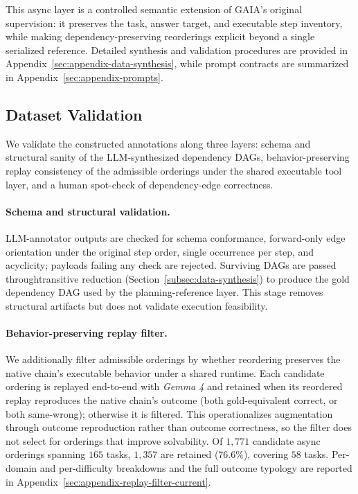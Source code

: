 \documentclass{article}
\providecommand{\model}[1]{\emph{#1}}
\begin{document}
This async layer is a controlled semantic extension of GAIA's original supervision: it preserves the task, answer target, and executable step inventory, while making dependency-preserving reorderings explicit beyond a single serialized reference. Detailed synthesis and validation procedures are provided in Appendix~\ref{sec:appendix-data-synthesis}, while prompt contracts are summarized in Appendix~\ref{sec:appendix-prompts}.

\subsection{Dataset Validation}
\label{sec:dataset-validation}

We validate the constructed annotations along three layers: schema and structural sanity of the LLM-synthesized dependency DAGs, behavior-preserving replay consistency of the admissible orderings under the shared executable tool layer, and a human spot-check of dependency-edge correctness.



\paragraph{Schema and structural validation.}
LLM-annotator outputs are checked for schema conformance, forward-only edge orientation under the original step order, single occurrence per step, and acyclicity; payloads failing any check are rejected. Surviving DAGs are passed throughtransitive reduction (Section~\ref{subsec:data-synthesis}) to produce the gold dependency DAG used by the planning-reference layer. This stage removes structural artifacts but does not validate execution feasibility.

\paragraph{Behavior-preserving replay filter.}
We additionally filter admissible orderings by whether reordering preserves the native chain's executable behavior under a shared runtime. Each candidate ordering is replayed end-to-end with \model{Gemma 4} and retained when its reordered replay reproduces the native chain's outcome (both gold-equivalent correct, or both same-wrong); otherwise it is filtered. This operationalizes augmentation through outcome reproduction rather than outcome correctness, so the filter does not select for orderings that improve solvability. Of $1{,}771$ candidate async orderings spanning $165$ tasks, $1{,}357$ are retained ($76.6\%$), covering $58$ tasks. Per-domain and per-difficulty breakdowns and the full outcome typology are reported in Appendix~\ref{sec:appendix-replay-filter-current}.
\end{document}
